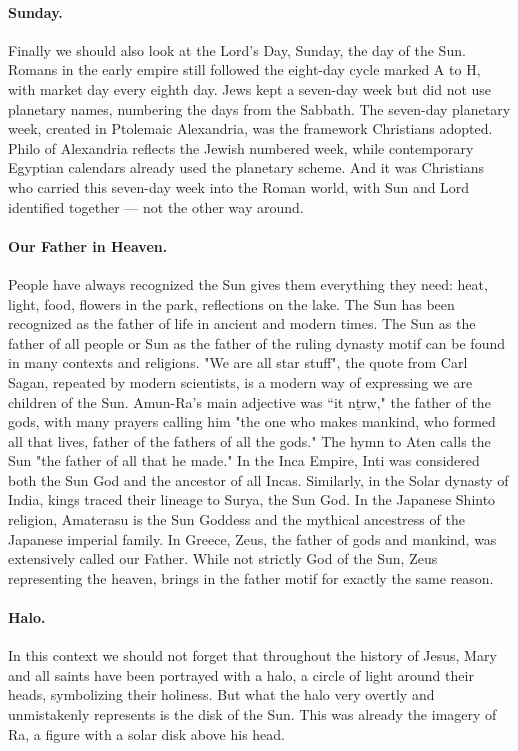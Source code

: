 \paragraph{Sunday.} Finally we should also look at the Lord’s Day, Sunday, the day of the Sun.
Romans in the early empire still followed the eight-day cycle marked A to H, with market day every eighth day.
Jews kept a seven-day week but did not use planetary names, numbering the days from the Sabbath.
The seven-day planetary week, created in Ptolemaic Alexandria, was the framework Christians adopted.
Philo of Alexandria reflects the Jewish numbered week, while contemporary Egyptian calendars already used the planetary scheme.
And it was Christians who carried this seven-day week into the Roman world, with Sun and Lord identified together — not the other way around.

\paragraph{Our Father in Heaven.}
People have always recognized the Sun gives them everything they need: heat, light, food, flowers in the park, reflections on the lake.
The Sun has been recognized as the father of life in ancient and modern times.
The Sun as the father of all people or Sun as the father of the ruling dynasty motif can be found in many contexts and religions.
"We are all star stuff", the quote from Carl Sagan, repeated by modern scientists, is a modern way of expressing we are children of the Sun.
Amun-Ra's main adjective was “it nṯrw," the father of the gods, with many prayers calling him "the one who makes mankind, who formed all that lives, father of the fathers of all the gods."
The hymn to Aten calls the Sun "the father of all that he made."
In the Inca Empire, Inti was considered both the Sun God and the ancestor of all Incas.
Similarly, in the Solar dynasty of India, kings traced their lineage to Surya, the Sun God.
In the Japanese Shinto religion, Amaterasu is the Sun Goddess and the mythical ancestress of the Japanese imperial family.
In Greece, Zeus, the father of gods and mankind, was extensively called our Father.
While not strictly God of the Sun, Zeus representing the heaven, brings in the father motif for exactly the same reason.

\paragraph{Halo.}
In this context we should not forget that throughout the history of Jesus, Mary and all saints have been portrayed with a halo, a circle of light around their heads, symbolizing their holiness.
But what the halo very overtly and unmistakenly represents is the disk of the Sun.
This was already the imagery of Ra, a figure with a solar disk above his head.

